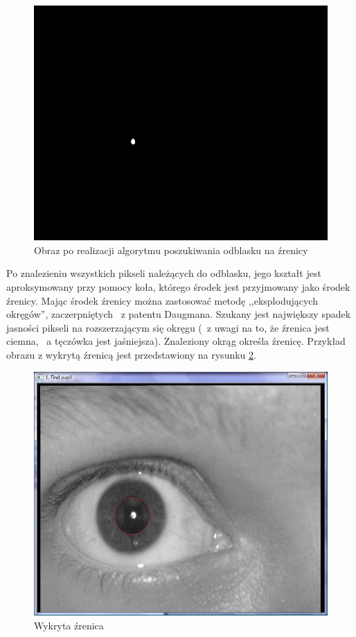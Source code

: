 \begin{figure}
\label{fig:dobryOdblask}
\begin{center}
\includegraphics[scale=0.5]{odblask.jpg}
\caption{Obraz po realizacji algorytmu poszukiwania odblasku na źrenicy}
\end{center}
\end{figure}

Po znalezieniu wszystkich pikseli należących do odblasku, jego kształt jest aproksymowany przy pomocy koła, którego środek jest przyjmowany jako środek źrenicy. Mając środek źrenicy można zastosować metodę ,,eksplodujących okręgów'', zaczerpniętych ~z patentu Daugmana. Szukany jest największy spadek  jasności pikseli na rozszerzającym się okręgu (~z uwagi na to, że źrenica jest ciemna, ~a tęczówka jest jaśniejsza). Znaleziony okrąg określa źrenicę. Przykład obrazu z wykrytą źrenicą jest przedstawiony na rysunku \ref{fig:zrenicaNasza}.

\begin{figure}
\label{fig:zrenicaNasza}
\begin{center}
\includegraphics[scale=0.5]{zrenica.jpg}
\caption{Wykryta źrenica}
\end{center}
\end{figure}

